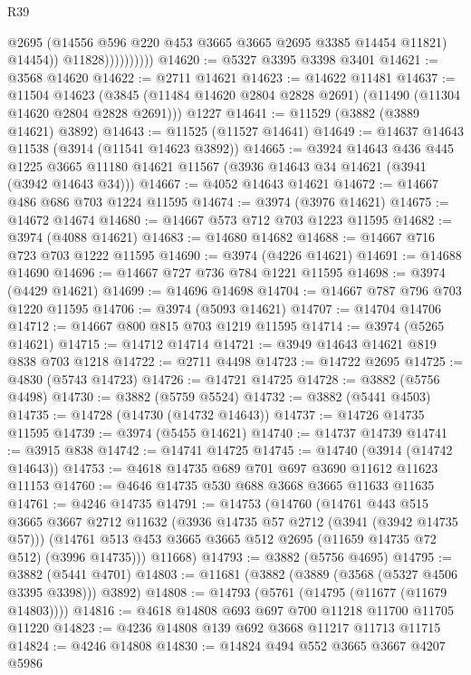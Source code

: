 \begin{lexlean}{R39}
\begin{coremodule}
                            @2695
                            (@14556 @596 @220 @453 @3665 @3665 @2695 @3385 @14454 @11821)
                            @14454))
                        @11828))))))))))
@14620 := @5327 @3395 @3398 @3401
@14621 := @3568 @14620
@14622 := @2711 @14621
@14623 := @14622 @11481
@14637 := @11504
    @14623
    (@3845 (@11484 @14620 @2804 @2828 @2691) (@11490 (@11304 @14620 @2804 @2828 @2691)))
    @1227
@14641 := @11529 (@3882 (@3889 @14621) @3892)
@14643 := @11525 (@11527 @14641)
@14649 := @14637 @14643 @11538 (@3914 (@11541 @14623 @3892))
@14665 := @3924
    @14643
    @436
    @445
    @1225
    @3665
    @11180
    @14621
    @11567
    (@3936 @14643 @34 @14621 (@3941 (@3942 @14643 @34)))
@14667 := @4052 @14643 @14621
@14672 := @14667 @486 @686 @703 @1224 @11595
@14674 := @3974 (@3976 @14621)
@14675 := @14672 @14674
@14680 := @14667 @573 @712 @703 @1223 @11595
@14682 := @3974 (@4088 @14621)
@14683 := @14680 @14682
@14688 := @14667 @716 @723 @703 @1222 @11595
@14690 := @3974 (@4226 @14621)
@14691 := @14688 @14690
@14696 := @14667 @727 @736 @784 @1221 @11595
@14698 := @3974 (@4429 @14621)
@14699 := @14696 @14698
@14704 := @14667 @787 @796 @703 @1220 @11595
@14706 := @3974 (@5093 @14621)
@14707 := @14704 @14706
@14712 := @14667 @800 @815 @703 @1219 @11595
@14714 := @3974 (@5265 @14621)
@14715 := @14712 @14714
@14721 := @3949 @14643 @14621 @819 @838 @703 @1218
@14722 := @2711 @4498
@14723 := @14722 @2695
@14725 := @4830 (@5743 @14723)
@14726 := @14721 @14725
@14728 := @3882 (@5756 @4498)
@14730 := @3882 (@5759 @5524)
@14732 := @3882 (@5441 @4503)
@14735 := @14728 (@14730 (@14732 @14643))
@14737 := @14726 @14735 @11595
@14739 := @3974 (@5455 @14621)
@14740 := @14737 @14739
@14741 := @3915 @838
@14742 := @14741 @14725
@14745 := @14740 (@3914 (@14742 @14643))
@14753 := @4618 @14735 @689 @701 @697 @3690 @11612 @11623 @11153
@14760 := @4646 @14735 @530 @688 @3668 @3665 @11633 @11635
@14761 := @4246 @14735
@14791 := @14753
    (@14760
      (@14761
        @443
        @515
        @3665
        @3667
        @2712
        @11632
        (@3936 @14735 @57 @2712 (@3941 (@3942 @14735 @57)))
        (@14761 @513 @453 @3665 @3665 @512 @2695 (@11659 @14735 @72 @512) (@3996 @14735)))
      @11668)
@14793 := @3882 (@5756 @4695)
@14795 := @3882 (@5441 @4701)
@14803 := @11681 (@3882 (@3889 (@3568 (@5327 @4506 @3395 @3398))) @3892)
@14808 := @14793 (@5761 (@14795 (@11677 (@11679 @14803))))
@14816 := @4618 @14808 @693 @697 @700 @11218 @11700 @11705 @11220
@14823 := @4236 @14808 @139 @692 @3668 @11217 @11713 @11715
@14824 := @4246 @14808
@14830 := @14824 @494 @552 @3665 @3667 @4207 @5986

\end{coremodule}
\end{lexlean}
